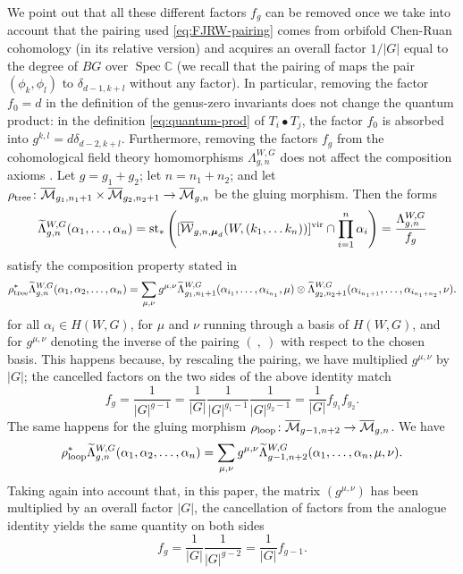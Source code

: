 \documentclass[11pt]{amsart}
\theoremstyle{definition} %
\theoremstyle{remark} %
\newcommand{\CC}{\mathbb C}
\newcommand{\Spec}{\operatorname{Spec}}
\newcommand{\al}{\alpha}
\providecommand{\abs}[1]{\lvert#1\rvert}
\def\vir{{\rm vir}}
\def\ol{\overline}
\def\wt{\widetilde}
\newcommand{\bmu}{\boldsymbol{\mu}}
\newcommand{\FJRW}{{\operatorname{FJRW}}}
\begin{document}
We point out that all these different  
factors $f_g$ can be removed once we take into 
account that the pairing used \eqref{eq:FJRW-pairing}  comes from orbifold 
Chen-Ruan cohomology (in its relative version) and acquires 
an overall factor $1/\abs{G}$ equal to the degree of  
$BG$ over $\Spec \CC$ (we recall that the pairing of \cite{FJR1} 
maps the pair $(\phi_k, \phi_l)$ to $\delta_{d-1,k+l}$ 
without any factor). 
In particular, removing the factor $f_0=d$ in the definition of 
the genus-zero invariants does not change the quantum product: 
in the definition \eqref{eq:quantum-prod} of $T_i\bullet T_j$,  
the factor $f_0$ is absorbed into $g^{k,l}=d\delta_{d-2,k+l}$. 
Furthermore, removing the factors $f_g$ from the cohomological 
field theory homomorphisms $\Lambda_{g,n}^{W,G}$ 
does not affect the composition axioms \cite[(62),(64)]{FJR1}. 
Let $g = g_1 + g_2$;  let $n = n_1 + n_2$; and let
$\rho_{\rm tree} \colon  \ol {\mathcal M}_{g_1,n_1+1}\times  
\ol{\mathcal M}_{g_2,n_2+1}
\to \ol {\mathcal M}_{g,n}$ 
be the gluing morphism. Then the forms 
$$\wt \Lambda^{W,G}_{g,n}(\al_1,\dots,\al_n)= 
{\rm st}_*\left([\ol{\mathcal W}_{g,n,\bmu_d} 
(W,(k_1,\dots k_n))]^{\vir}\cap 
\prod_{i=1}^n \al_i \right)=\frac{\Lambda_{g,n}^{W,G}}{f_g}$$
satisfy the composition
property stated in \cite[(62)]{FJR1}
\[
\rho_{\rm tree}^*
\wt\Lambda^{W,G}_{g,n}(\alpha_1, \alpha_2,\dots, \alpha_n) =
\sum_{\mu,\nu} g^{\mu,\nu}
\wt\Lambda^{W,G}_{g_1,n_1+1}(\alpha_{i_1},\dots,\alpha_{i_{n_1}},\mu) \otimes 
\wt\Lambda^{W,G}_{g_2,n_2+1}(\alpha_{i_{n_1+1}},\dots,\alpha_{i_{n_1+n_2}},\nu).
\]
for all $\al_i\in H(W,G)$, for $\mu$ and $\nu$ 
running through a basis of $H(W,G)$, and for 
$g^{\mu,\nu}$ denoting the inverse of the pairing 
$(\ , \ )$ with respect to the chosen basis. 
This happens because, by rescaling the pairing, we have 
multiplied $g^{\mu,\nu}$ by $\abs{G}$; 
the cancelled factors on the two sides of the above identity match
\[
f_g = \frac{1}{\abs{G}^{g-1}}
=\frac{1}{\abs{G}}\frac{1}{\abs{G}^{g_1-1}}\frac{1}{\abs{G}^{g_2-1}}
=\frac{1}{\abs{G}}f_{g_1}f_{g_2}.
\]
The same happens for the gluing morphism 
$\rho_{\rm loop} \colon  \ol {\mathcal M}_{g-1,n+2}\to \ol{\mathcal M}_{g,n}$. 
We have  
\[
\rho_{\rm loop}^*
\wt\Lambda^{W,G}_{g,n}(\alpha_1, \alpha_2,\dots, \alpha_n) =
\sum_{\mu,\nu} g^{\mu,\nu}
\wt\Lambda^{W,G}_{g-1,n+2}(\alpha_{1},\dots,\alpha_{n},\mu,\nu).
\]
Taking again into account that, in this paper, the matrix $(g^{\mu,\nu})$ has been 
multiplied by an overall factor 
$\abs{G}$, the cancellation of factors from the analogue identity \cite[(64)]{FJR1} 
yields the same quantity on both sides 
$$f_g= \frac{1}{\abs{G}}\frac{1}{\abs{G}^{g-2}}=\frac{1}{\abs{G}} f_{g-1}.$$
\end{document}
